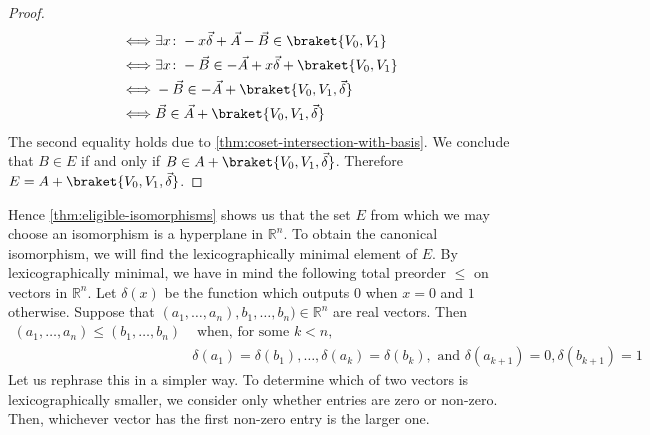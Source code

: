 \begin{proof}
\begin{align}
		\iff & \exists x\colon -x\vec \delta + \vec A - \vec B \in \braket{V_0,V_1} \\
		\iff & \exists x\colon -\vec B\in -\vec A+x\vec \delta + \braket{V_0,V_1} \\
		\iff & -\vec B\in -\vec A+\braket{V_0,V_1,\vec\delta} \\
		\iff & \vec B\in \vec A+\braket{V_0,V_1,\vec\delta}
	\end{align}
	The second equality holds due to \autoref{thm:coset-intersection-with-basis}.
	We conclude that $B\in E$ if and only if $B\in A+\braket{V_0,V_1,\vec\delta}$.
	Therefore $E=A+\braket{V_0,V_1,\vec\delta}$.
\end{proof}

Hence \autoref{thm:eligible-isomorphisms} shows us that the set $E$ from which we may choose an isomorphism is a hyperplane in $\mathbb R^n$.
To obtain the canonical isomorphism, we will find the lexicographically minimal element of $E$.
By lexicographically minimal, we have in mind the following total preorder $\leq$ on vectors in $\mathbb R^n$.
Let $\delta(x)$ be the function which outputs $0$ when $x=0$ and $1$ otherwise.
Suppose that $(a_1,\ldots, a_n),b_1,\ldots, b_n)\in \mathbb R^n$ are real vectors.
Then
\begin{align}
	(a_1,\ldots, a_n) \leq (b_1,\ldots, b_n) &\text{ when, for some }k<n,\\
	& \delta(a_1)=\delta(b_1),\ldots, \delta(a_k)=\delta(b_k),\text{ and } \delta(a_{k+1})=0,\delta(b_{k+1})=1
\end{align}
Let us rephrase this in a simpler way.
To determine which of two vectors is lexicographically smaller, we consider only whether entries are zero or non-zero.
Then, whichever vector has the first non-zero entry is the larger one.

